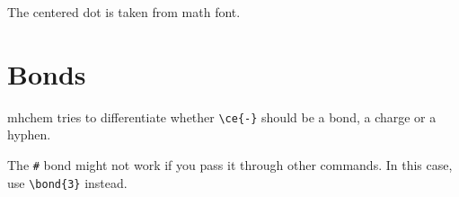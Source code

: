 \documentclass[a4paper,notitlepage,parskip=half]{scrreprt}
\begin{document}
The centered dot is taken from math font.


\section{Bonds}

\begin{SideBySideExample}[xrightmargin=3cm]
\end{SideBySideExample}

\begin{SideBySideExample}[xrightmargin=3cm]
\end{SideBySideExample}

\begin{SideBySideExample}[xrightmargin=3cm]
  \sffamily\bfseries
\end{SideBySideExample}

mhchem tries to differentiate whether \verb|\ce{-}| should be a bond, a charge or a hyphen.

The \verb|#| bond might not work if you pass it through other commands. In this case, use \verb|\bond{3}| instead.

\begin{SideBySideExample}[xrightmargin=3cm]
\end{SideBySideExample}

\begin{SideBySideExample}[xrightmargin=3cm]
\end{SideBySideExample}

\begin{SideBySideExample}[xrightmargin=3cm]
\end{SideBySideExample}

\begin{SideBySideExample}[xrightmargin=3cm]
\end{SideBySideExample}

\begin{SideBySideExample}[xrightmargin=3cm]
\end{SideBySideExample}

\begin{SideBySideExample}[xrightmargin=3cm]
\end{SideBySideExample}
\end{document}
